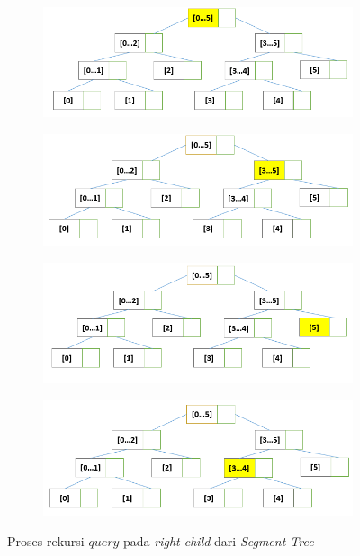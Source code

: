 \begin{figure}[H]
	\begin{subfigure}{.5\textwidth}
		\centering
		\includegraphics[scale=0.3]{assets/images/Query_ST_1.PNG}
		\caption{}
		\label{fig:subqueryST1}
	\end{subfigure}
	\begin{subfigure}{.5\textwidth}
		\centering
		\includegraphics[scale=0.3]{assets/images/Query_ST_2.PNG}
		\caption{}
		\label{fig:subqueryST2}
	\end{subfigure}
	\begin{subfigure}{.5\textwidth}
		\centering \includegraphics[scale=0.3]{assets/images/Query_ST_3.PNG}
		\caption{}
		\label{fig:subqueryST3}
	\end{subfigure}
	\begin{subfigure}{.5\textwidth}
		\centering
		\includegraphics[scale=0.3]{assets/images/Query_ST_4.PNG}
		\caption{}
		\label{fig:subqueryST4}
	\end{subfigure}	
	\caption{Proses rekursi \textit{$query$} pada \textit{right child} dari \textit{Segment Tree} }
	\label{fig:queryST1}
\end{figure}
